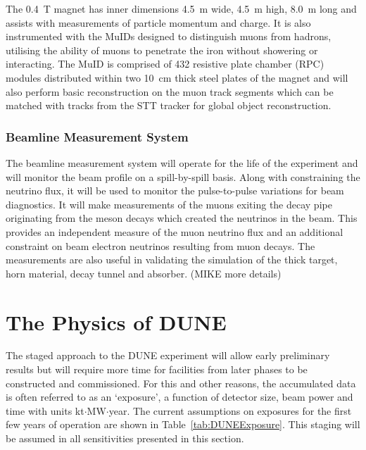 The 0.4~T magnet has inner dimensions 4.5~m wide, 4.5~m high, 8.0~m long and assists with measurements of particle momentum and charge.  It is also instrumented with the MuIDs designed to distinguish muons from hadrons, utilising the ability of muons to penetrate the iron without showering or interacting.  The MuID is comprised of 432 resistive plate chamber (RPC) modules distributed within two 10~cm thick steel plates of the magnet and will also perform basic reconstruction on the muon track segments which can be matched with tracks from the STT tracker for global object reconstruction.

\subsubsection{Beamline Measurement System}\label{sec:BLM}

The beamline measurement system will operate for the life of the experiment and will monitor the beam profile on a spill-by-spill basis.  Along with constraining the neutrino flux, it will be used to monitor the pulse-to-pulse variations for beam diagnostics.  It will make measurements of the muons exiting the decay pipe originating from the meson decays which created the neutrinos in the beam.  This provides an independent measure of the muon neutrino flux and an additional constraint on beam electron neutrinos resulting from muon decays.  The measurements are also useful in validating the simulation of the thick target, horn material, decay tunnel and absorber. (MIKE more details)

\section{The Physics of DUNE}\label{sec:DUNEPhysics}

The staged approach to the DUNE experiment will allow early preliminary results but will require more time for facilities from later phases to be constructed and commissioned.  For this and other reasons, the accumulated data is often referred to as an `exposure', a function of detector size, beam power and time with units kt$\cdot$MW$\cdot$year.  The current assumptions on exposures for the first few years of operation are shown in Table~\ref{tab:DUNEExposure}.  This staging will be assumed in all sensitivities presented in this section.

